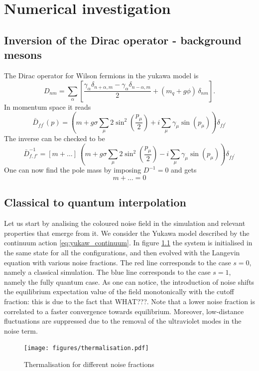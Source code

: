 \chapter{Numerical investigation}

\section{Inversion of the Dirac operator - background mesons}

The Dirac operator for Wilson fermions in the yukawa model is
\begin{equation*}
D_{n m}=\sum_\alpha\left[\frac{\gamma_\alpha \delta_{n+\alpha, m} - \gamma_\alpha \delta_{n-\alpha, m}}{2} + (m_q + g \phi) \, \delta_{n m}\right] .
\end{equation*}
In momentum space it reads
\begin{equation*}
\bar{D}_{f f^{\prime}}(p)=\left(m+ g \sigma \sum_\mu 2 \sin ^2\left(\frac{p_\mu}{2}\right)+i \sum_\mu \gamma_\mu \sin \left(p_\mu\right)\right) \delta_{f f^{\prime}}
\end{equation*}
The inverse can be checked to be 
\begin{equation*}
    \bar D_{f,f'} ^{-1} = \left[m + \dots\right] \ \left(m+ g \sigma \sum_\mu 2 \sin ^2\left(\frac{p_\mu}{2}\right) - i \sum_\mu \gamma_\mu \sin \left(p_\mu\right)\right) \delta_{f f^{\prime}}
\end{equation*}
One can now find the pole mass by imposing $D^{-1} = 0$ and gets 
\begin{equation*}
    m + \dots = 0
\end{equation*}

\section{Classical to quantum interpolation}
\label{sec:classical_to_quantum}

Let us start by analising the coloured noise field in the simulation and relevant properties that emerge from it. We consider the Yukawa model described by the continuum action \ref{eq:yukaw_continuum}.
In figure \ref{fig:thermalisation_different_noise_fracs} the system is initialised in the same state for all the configurations, and then evolved with the Langevin equation with various noise fractions. The red line corresponds to the case $s=0$, namely a classical simulation. The blue line corresponds to the case $s=1$, namely the fully quantum case. As one can notice, the introduction of noise shifts the equilibrium expectation value of the field monotonically with the cutoff fraction: this is due to the fact that WHAT???. Note that a lower noise fraction is correlated to a faster convergence towards equilibrium. Moreover, low-distance fluctuations are suppressed due to the removal of the ultraviolet modes in the noise term.
\begin{figure}
    \centering
    \texttt{[image: figures/thermalisation.pdf]}
    \caption{Thermalisation for different noise fractions}
    \label{fig:thermalisation_different_noise_fracs}
\end{figure}

